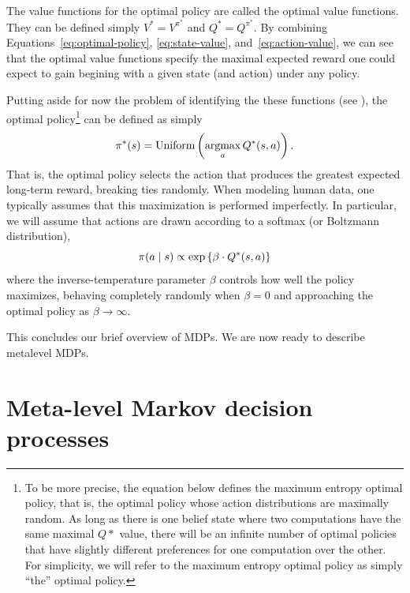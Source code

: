 The value functions for the optimal policy are called the optimal value functions. They can be defined simply $V^* = V^{\pi^*}$ and $Q^* = Q^{\pi^*}$. By combining Equations~\ref{eq:optimal-policy}, \ref{eq:state-value}, and~\ref{eq:action-value}, we can see that the optimal value functions specify the maximal expected reward one could expect to gain begining with a given state (and action) under any policy.

Putting aside for now the problem of identifying the these functions (see \citealp{puterman2014markov}), the optimal policy\footnote{%
  To be more precise, the equation below defines the maximum entropy optimal policy, that is, the optimal policy whose action distributions are maximally random. As long as there is one belief state where two computations have the same maximal $Q*$ value, there will be an infinite number of optimal policies that have slightly different preferences for one computation over the other. For simplicity, we will refer to the maximum entropy optimal policy as simply ``the'' optimal policy.
} can be defined as simply
%
\begin{equation}\label{eq:argmaxQ}
  \pi^*(s) = \text{Uniform}\left(\operatorname*{argmax}_a Q^*(s, a)\right).
\end{equation}
%
That is, the optimal policy selects the action that produces the greatest expected long-term reward, breaking ties randomly. When modeling human data, one typically assumes that this maximization is performed imperfectly. In particular, we will assume that actions are drawn according to a softmax (or Boltzmann distribution),
%
\begin{equation}
  \pi(a \mid s) \propto \exp\left\{\beta \cdot Q^*(s, a)\right\}
\end{equation}
%
where the inverse-temperature parameter $\beta$ controls how well the policy maximizes, behaving completely randomly when $\beta = 0$ and approaching the optimal policy as $\beta \rightarrow \infty$.

This concludes our brief overview of MDPs. We are now ready to describe metalevel MDPs.


\section{Meta-level Markov decision processes}

